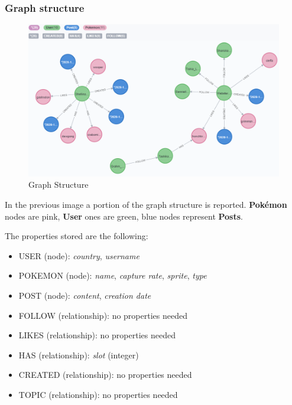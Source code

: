 \subsubsection{Graph structure}
\begin{figure}[H]
	\centering
	\includegraphics[width=\textwidth]{img/graph_structure.png}
	\caption{Graph Structure}
\end{figure}

In the previous image a portion of the graph structure is reported. 
\textbf{Pokémon} nodes are pink, \textbf{User} ones are green, blue nodes represent \textbf{Posts}.

The properties stored are the following:
\begin{itemize}
	\item USER (node): \textit{country}, \textit{username}
	\item POKEMON (node): \textit{name}, \textit{capture rate},  \textit{sprite}, \textit{type}
	\item POST (node): \textit{content}, \textit{creation date}
	\item FOLLOW (relationship): no properties needed
	\item LIKES (relationship): no properties needed
	\item HAS (relationship): \textit{slot} (integer)
	\item CREATED (relationship): no properties needed
	\item TOPIC (relationship): no properties needed
\end{itemize}


